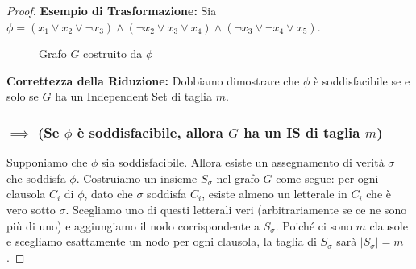 \documentclass[a4paper]{article}
\theoremstyle{definition} %
\theoremstyle{definition} %
\begin{document}
\begin{proof}
\textbf{Esempio di Trasformazione:}
Sia $\phi = (x_1 \lor x_2 \lor \neg x_3) \land (\neg x_2 \lor x_3 \lor x_4) \land (\neg x_3 \lor \neg x_4 \lor x_5)$.
\begin{figure}[h]
    \centering
    \caption{Grafo $G$ costruito da $\phi$}
    \label{fig:is_reduction_graph}
\end{figure}

\textbf{Correttezza della Riduzione:}
Dobbiamo dimostrare che $\phi$ è soddisfacibile se e solo se $G$ ha un Independent Set di taglia $m$.

\subsubsection{$\implies$ (Se $\phi$ è soddisfacibile, allora $G$ ha un IS di taglia $m$)}
Supponiamo che $\phi$ sia soddisfacibile. Allora esiste un assegnamento di verità $\sigma$ che soddisfa $\phi$.
Costruiamo un insieme $S_\sigma$ nel grafo $G$ come segue: per ogni clausola $C_i$ di $\phi$, dato che $\sigma$ soddisfa $C_i$, esiste almeno un letterale in $C_i$ che è vero sotto $\sigma$. Scegliamo uno di questi letterali veri (arbitrariamente se ce ne sono più di uno) e aggiungiamo il nodo corrispondente a $S_\sigma$.
Poiché ci sono $m$ clausole e scegliamo esattamente un nodo per ogni clausola, la taglia di $S_\sigma$ sarà $|S_\sigma|=m$.


\end{proof}
\end{document}
